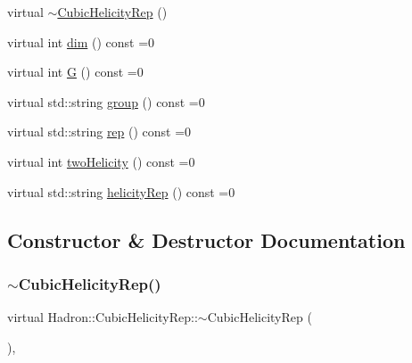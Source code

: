 \begin{DoxyCompactItemize}
\item 
virtual \mbox{\hyperlink{structHadron_1_1CubicHelicityRep_a8ac31a49aff79450f4505e20fc8b6b15}{$\sim$\+Cubic\+Helicity\+Rep}} ()
\item 
virtual int \mbox{\hyperlink{structHadron_1_1CubicHelicityRep_a95d229a05580e65f8bdde74a1e316855}{dim}} () const =0
\item 
virtual int \mbox{\hyperlink{structHadron_1_1CubicHelicityRep_a50689f42be1e6170aa8cf6ad0597018b}{G}} () const =0
\item 
virtual std\+::string \mbox{\hyperlink{structHadron_1_1CubicHelicityRep_a101a7d76cd8ccdad0f272db44b766113}{group}} () const =0
\item 
virtual std\+::string \mbox{\hyperlink{structHadron_1_1CubicHelicityRep_a8cdd86f068a167dc96faef02bfb8a33d}{rep}} () const =0
\item 
virtual int \mbox{\hyperlink{structHadron_1_1CubicHelicityRep_af507aa56fc2747eacc8cb6c96db31ecc}{two\+Helicity}} () const =0
\item 
virtual std\+::string \mbox{\hyperlink{structHadron_1_1CubicHelicityRep_af1096946b7470edf0a55451cc662f231}{helicity\+Rep}} () const =0
\end{DoxyCompactItemize}


\subsection{Constructor \& Destructor Documentation}
\mbox{\label{structHadron_1_1CubicHelicityRep_a8ac31a49aff79450f4505e20fc8b6b15}} 
\subsubsection{\texorpdfstring{$\sim$CubicHelicityRep()}{~CubicHelicityRep()}\hspace{0.1cm}{\footnotesize\ttfamily [1/3]}}
{\footnotesize\ttfamily virtual Hadron\+::\+Cubic\+Helicity\+Rep\+::$\sim$\+Cubic\+Helicity\+Rep (\begin{DoxyParamCaption}{ }\end{DoxyParamCaption})\hspace{0.3cm}{\ttfamily [inline]}, {\ttfamily [virtual]}}

\mbox{\label{structHadron_1_1CubicHelicityRep_a8ac31a49aff79450f4505e20fc8b6b15}} 
